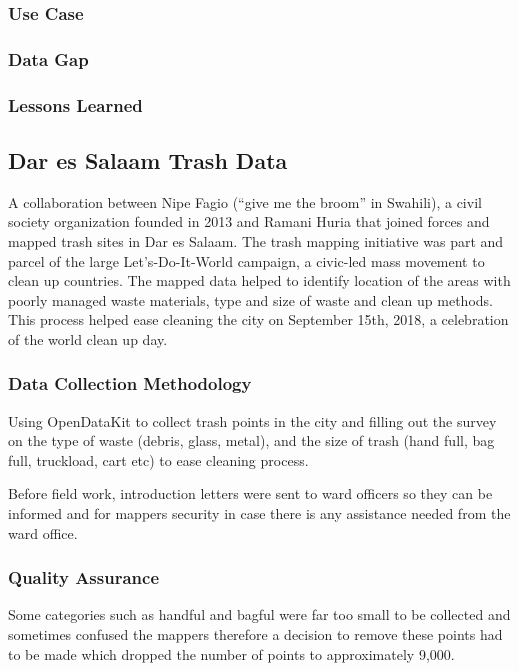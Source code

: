 \documentclass[a4paper,12pt,twoside]{article}
\begin{document}
\subsubsection{Use Case}
\subsubsection{Data Gap}
\subsubsection{Lessons Learned}


\newpage
\subsection{Dar es Salaam Trash Data}

A collaboration between Nipe Fagio (“give me the broom” in Swahili), a civil society organization founded in 2013 and Ramani Huria that joined forces and mapped trash sites in Dar es Salaam. The trash mapping initiative was part and parcel of the large Let’s-Do-It-World campaign, a civic-led mass movement to clean up countries.
The mapped data helped to identify location of the areas with poorly managed waste materials, type and size of waste and clean up methods. This process helped ease cleaning the city on September 15th, 2018, a celebration of the world clean up day.

\subsubsection{Data Collection Methodology}
Using OpenDataKit to collect trash points in the city and filling out the survey on the type of waste (debris, glass, metal), and the size of trash (hand full, bag full, truckload, cart etc) to ease cleaning process.

Before field work, introduction letters were sent to ward officers so they can be informed and for mappers security in case there is any assistance needed from the ward office.

\subsubsection{Quality Assurance}
Some categories such as handful and bagful were far too small to be collected and sometimes confused the mappers therefore a decision to remove these points had to be made which dropped the number of points to approximately 9,000.
\end{document}
